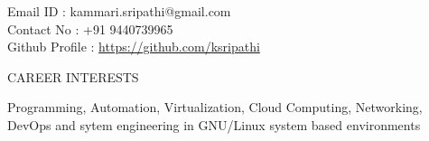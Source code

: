 \documentclass{resume} %
\newcommand{\blank}[1]{\hspace*{#1}}
\begin{document}
\blank{5 cm}
{Email ID} \blank{0.7 cm} :
kammari.sripathi@gmail.com \\
\blank{5 cm} 
{Contact No} \blank{0.3 cm} :
+91 9440739965 \\
\blank{5 cm}
{Github Profile : }
\url{https://github.com/ksripathi}
\sectionlineskip \\


\begin{rSection}{CAREER INTERESTS}
  
  { Programming, Automation, Virtualization, Cloud Computing,
    Networking, DevOps and sytem engineering in GNU/Linux system based
    environments }


\end{rSection}

\end{document}
